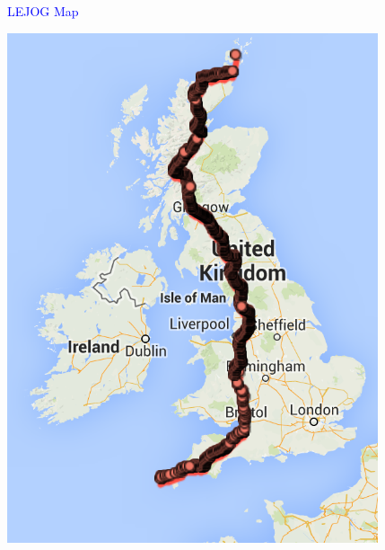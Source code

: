 \documentclass[landscape]{slides}
\begin{document}
\begin{slide}

    \textcolor{blue}{\Large{LEJOG Map}}

    \begin{center}
        \includegraphics[height=15cm]{lejog-all}
    \end{center}

\end{slide}
\end{document}
